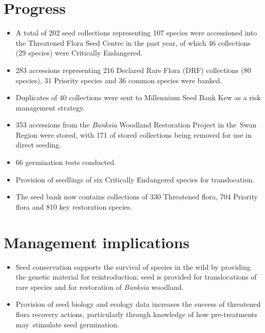\documentclass[version=last,
    paper=a4, %
    10pt, %
    usenames,
    dvipsnames,
    oneside, %
    headings=openany, %
    DIV=15 %
]{scrbook}
\begin{document}
\section*{Progress}
\begin{itemize}
\itemsep1pt\parskip0pt
\item
  A total of 202 seed collections representing 107 species were
  accessioned into the Threatened Flora Seed Centre in the past year, of
  which 46 collections (29 species) were Critically Endangered.
\item
  283 accessions representing 216 Declared Rare Flora (DRF) collections
  (80 species), 31 Priority species and 36 common species were banked.
\item
  Duplicates of 40 collections were sent to Millennium Seed Bank Kew as
  a risk management strategy.
\item
  353 accessions from the \emph{Banksia} Woodland Restoration Project in
  the~Swan Region were stored, with 171 of stored collections being
  removed for use in direct seeding.
\item
  66 germination tests conducted.
\item
  Provision of seedlings of six Critically Endangered species for
  translocation.
\item
  The seed bank now contains collections of 330 Threatened flora, 704
  Priority flora and 810 key restoration species.
\end{itemize}



\section*{Management implications}
\begin{itemize}
\itemsep1pt\parskip0pt
\item
  Seed conservation supports the survival of species in the wild by
  providing the genetic material for reintroduction; seed is provided
  for translocations of rare species and for restoration of
  \emph{Banksia} woodland.
\item
  Provision of seed biology and ecology data increases the success of
  threatened flora recovery actions, particularly through knowledge of
  how pre-treatments may~stimulate seed germination.
\end{itemize}
\end{document}
